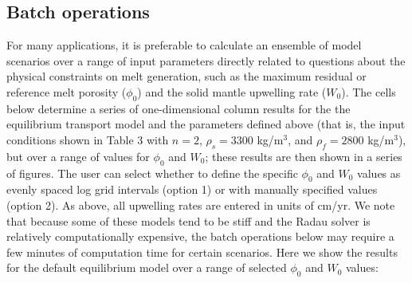 \documentclass[draft]{agujournal2019}
\begin{document}
\subsection{Batch operations}

For many applications, it is preferable to calculate an ensemble of model scenarios over a range of input parameters directly related to questions about the physical constraints on melt generation, such as the maximum residual or reference melt porosity ($\phi_0$) and the solid mantle upwelling rate ($W_0$). The cells below determine a series of one-dimensional column results for the the equilibrium transport model and the parameters defined above (that is, the input conditions shown in Table 3 with $n = 2$, $\rho_s = 3300$ kg/m$^3$, and $\rho_f = 2800$ kg/m$^3$), but over a range of values for $\phi_0$ and $W_0$; these results are then shown in a series of figures. The user can select whether to define the specific $\phi_0$ and $W_0$ values as evenly spaced log grid intervals (option 1) or with manually specified values (option 2). As above, all upwelling rates are entered in units of cm/yr. We note that because some of these models tend to be stiff and the Radau solver is relatively computationally expensive, the batch operations below may require a few minutes of computation time for certain scenarios. Here we show the results for the default equilibrium model over a range of selected $\phi_0$ and $W_0$ values:
\end{document}
